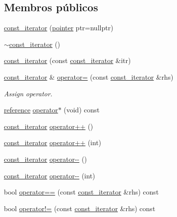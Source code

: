\subsection*{Membros públicos}
\begin{DoxyCompactItemize}
\item 
\mbox{\hyperlink{classsc_1_1vector_1_1const__iterator_ab615f8abb9b7831cbdcb9ea061df88e2}{const\+\_\+iterator}} (\mbox{\hyperlink{classsc_1_1vector_1_1const__iterator_a8548fb2f328af0cee731c77f7ca9c9a3}{pointer}} ptr=nullptr)
\item 
\mbox{\hyperlink{classsc_1_1vector_1_1const__iterator_abd6ea8cbc62ca206401ad590f288f710}{$\sim$const\+\_\+iterator}} ()
\item 
\mbox{\hyperlink{classsc_1_1vector_1_1const__iterator_aa1d513fee7461529b1c2b704019caa38}{const\+\_\+iterator}} (const \mbox{\hyperlink{classsc_1_1vector_1_1const__iterator}{const\+\_\+iterator}} \&itr)
\item 
\mbox{\hyperlink{classsc_1_1vector_1_1const__iterator}{const\+\_\+iterator}} \& \mbox{\hyperlink{classsc_1_1vector_1_1const__iterator_a2122dfbc461d6bc1f18690cb9ad08353}{operator=}} (const \mbox{\hyperlink{classsc_1_1vector_1_1const__iterator}{const\+\_\+iterator}} \&rhs)
\begin{DoxyCompactList}\small\item\em Assign operator. \end{DoxyCompactList}\item 
\mbox{\hyperlink{classsc_1_1vector_1_1const__iterator_a750fedbe98f230fe9bf520117730485b}{reference}} \mbox{\hyperlink{classsc_1_1vector_1_1const__iterator_acfa1d4962b2324b5cf0a7eddfbd45450}{operator$\ast$}} (void) const
\item 
\mbox{\hyperlink{classsc_1_1vector_1_1const__iterator}{const\+\_\+iterator}} \mbox{\hyperlink{classsc_1_1vector_1_1const__iterator_a3cc519aa78c728251dc157b641bda883}{operator++}} ()
\item 
\mbox{\hyperlink{classsc_1_1vector_1_1const__iterator}{const\+\_\+iterator}} \mbox{\hyperlink{classsc_1_1vector_1_1const__iterator_a68877e764d63f2544e264cd8eecb77ba}{operator++}} (int)
\item 
\mbox{\hyperlink{classsc_1_1vector_1_1const__iterator}{const\+\_\+iterator}} \mbox{\hyperlink{classsc_1_1vector_1_1const__iterator_ad6ee45c30ea01cceb40c2494aea02d0f}{operator-\/-\/}} ()
\item 
\mbox{\hyperlink{classsc_1_1vector_1_1const__iterator}{const\+\_\+iterator}} \mbox{\hyperlink{classsc_1_1vector_1_1const__iterator_a1fa24070f4f30fea4d34bb9a6c669f3e}{operator-\/-\/}} (int)
\item 
bool \mbox{\hyperlink{classsc_1_1vector_1_1const__iterator_a3f7bd553bd903e94df8942c1809f0e8e}{operator==}} (const \mbox{\hyperlink{classsc_1_1vector_1_1const__iterator}{const\+\_\+iterator}} \&rhs) const
\item 
bool \mbox{\hyperlink{classsc_1_1vector_1_1const__iterator_af5fa6b6215c897703b800176381cbe35}{operator!=}} (const \mbox{\hyperlink{classsc_1_1vector_1_1const__iterator}{const\+\_\+iterator}} \&rhs) const
\end{DoxyCompactItemize}


